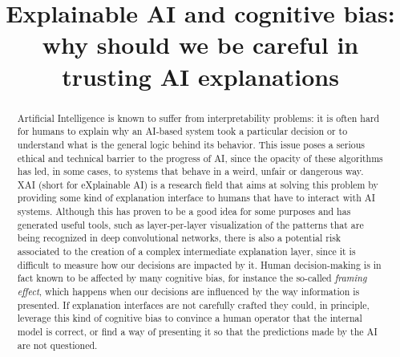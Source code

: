 \documentclass[conference]{IEEEtran}
\begin{document}
\title{Explainable AI and cognitive bias: why should we be careful in trusting AI explanations}


\author{
    }

\maketitle

\begin{abstract}
    Artificial Intelligence is known to suffer from interpretability problems:
    it is often hard for humans to explain why an AI-based system took a
    particular decision or to understand what is the general logic behind its
    behavior.
    This issue poses a serious ethical and technical barrier to the progress
    of AI, since the opacity of these algorithms has led, in some cases, to  systems that behave in a weird, unfair or dangerous way.
    XAI (short for eXplainable AI) is a research field
    that aims at solving this problem by providing some kind of explanation
    interface to humans that have to interact with AI systems.
    Although this has proven to be a good idea for some purposes and has generated useful tools, such as layer-per-layer visualization of the patterns that are being recognized in deep convolutional networks, there is also a potential risk associated to the creation of a complex intermediate explanation layer, since it is difficult to measure how our decisions are impacted by it. Human
    decision-making is in fact known to be affected by many cognitive bias, for instance the so-called \textit{framing effect}, which happens when our
    decisions are influenced by the way information is presented.
    If explanation interfaces are not carefully crafted they could, in principle, leverage this kind of cognitive bias to convince a human operator that the internal model is correct, or find a way of presenting it so that the predictions made by the AI are not questioned.

\end{abstract}
\end{document}
